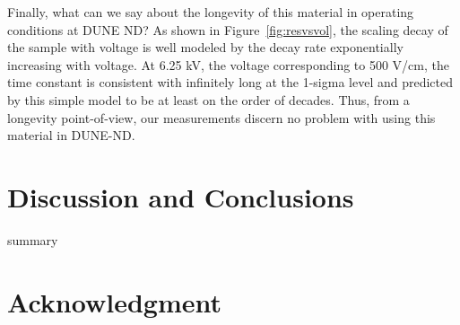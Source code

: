 \documentclass[a4paper,12pt]{article}
\begin{document}
Finally, what can we say about the longevity of this material in operating conditions at DUNE ND?
As shown in Figure~\ref{fig:resvsvol}, the scaling decay of the sample with voltage is well modeled by the  decay rate exponentially increasing with voltage. At 6.25 kV, the voltage corresponding to 500 V/cm, the time constant is consistent with infinitely long at the 1-sigma level and predicted by this simple model to be at least on the order of decades. Thus, from a longevity point-of-view, our measurements discern no problem with using this material in DUNE-ND.


\section{Discussion and Conclusions}
\label{sec:sum}


summary

\section{Acknowledgment} 



\clearpage


\end{document}
